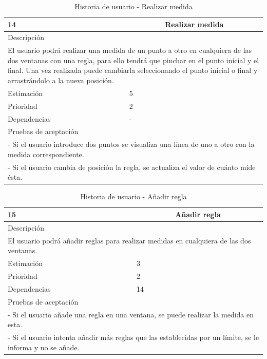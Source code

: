 \begin{table}[H]
	\begin{center}
		\begin{tabular} {|l|c|l|}
			\hline
			14 & \multicolumn{2}{c|}{Realizar medida} \\ \hline \hline
			\multicolumn{3}{|l|}{Descripción} \\ \hline
			\multicolumn{3}{|p{12cm}|}{El usuario podrá realizar una medida de un punto a otro en cualquiera de las dos ventanas con una regla, para ello tendrá que pinchar en el punto inicial y el final. Una vez realizada puede cambiarla seleccionando el punto inicial o final y arrastrándolo a la nueva posición.} \\ \hline
			\multicolumn{2}{|l|}{Estimación} & 5 \\ \hline
			\multicolumn{2}{|l|}{Prioridad} & 2 \\ \hline
			\multicolumn{2}{|l|}{Dependencias} & - \\ \hline
			\multicolumn{3}{|l|}{Pruebas de aceptación} \\ \hline
			\multicolumn{3}{|p{12cm}|}{ - Si el usuario introduce dos puntos se visualiza una línea de uno a otro con la medida correspondiente.} \\
			\multicolumn{3}{|p{12cm}|}{ - Si el usuario cambia de posición la regla, se actualiza el valor de cuánto mide ésta.} \\ \hline
		\end{tabular}
	\end{center}
	\caption{Historia de usuario - Realizar medida}
	\label{tab:hu_realizar_medida}
\end{table}

\begin{table}[H]
	\begin{center}
		\begin{tabular} {|l|c|l|}
			\hline
			15 & \multicolumn{2}{c|}{Añadir regla} \\ \hline \hline
			\multicolumn{3}{|l|}{Descripción} \\ \hline
			\multicolumn{3}{|p{12cm}|}{El usuario podrá añadir reglas para realizar medidas en cualquiera de las dos ventanas.} \\ \hline
			\multicolumn{2}{|l|}{Estimación} & 3 \\ \hline
			\multicolumn{2}{|l|}{Prioridad} & 2 \\ \hline
			\multicolumn{2}{|l|}{Dependencias} & 14 \\ \hline
			\multicolumn{3}{|l|}{Pruebas de aceptación} \\ \hline
			\multicolumn{3}{|p{12cm}|}{ - Si el usuario añade una regla en una ventana, se puede realizar la medida en esta.} \\
			\multicolumn{3}{|p{12cm}|}{ - Si el usuario intenta añadir más reglas que las establecidas por un límite, se le informa y no se añade.} \\ \hline
		\end{tabular}
	\end{center}
	\caption{Historia de usuario - Añadir regla}
	\label{tab:hu_anadir_regla}
\end{table}

